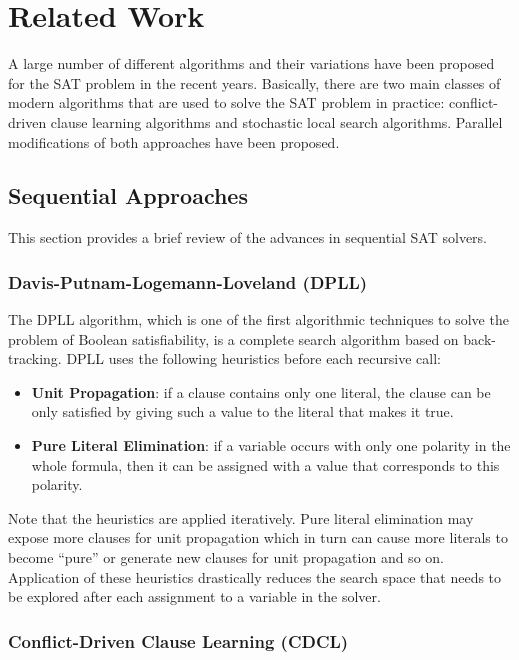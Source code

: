 \documentclass[letterpaper, compsoc, conference]{IEEEtran}
\begin{document}
\section{Related Work}
\label{sec:related}

A large number of different algorithms and their variations have been proposed for 
the SAT problem in the recent years. Basically, there are two main classes of modern 
algorithms that are used to solve the SAT problem in practice: conflict-driven 
clause learning algorithms and stochastic local search algorithms. Parallel modifications 
of both approaches have been proposed.

\subsection{Sequential Approaches}

This section provides a brief review of the advances in sequential SAT solvers.

\subsubsection{Davis-Putnam-Logemann-Loveland (DPLL)}

The DPLL algorithm, which is one of the first algorithmic techniques to solve
the problem of Boolean satisfiability, is a complete search algorithm based on
back-tracking. DPLL uses the following heuristics before each recursive call:

\begin{itemize}
\item \textbf{Unit Propagation}: if a clause contains only one literal, the clause 
can be only satisfied by giving such a value to the literal that makes it true. 

\item \textbf{Pure Literal Elimination}: if a variable occurs with only one
polarity in the whole formula, then it can be assigned with a value that
corresponds to this polarity.
\end{itemize}

Note that the heuristics are applied iteratively. Pure literal elimination may
expose more clauses for unit propagation which in turn can cause more literals
to become ``pure'' or generate new clauses for unit propagation and so on.
Application of these heuristics drastically reduces the search space that needs
to be explored after each assignment to a variable in the solver.

\subsubsection{Conflict-Driven Clause Learning (CDCL)}
\end{document}
